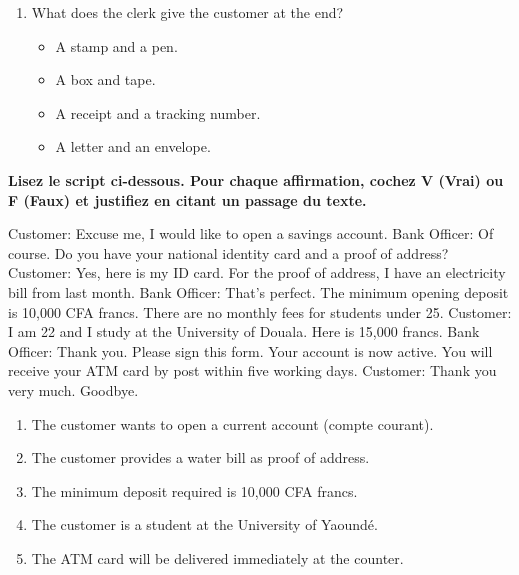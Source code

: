 \documentclass[11pt]{article}
\begin{document}
\begin{exercice}
\begin{enumerate}
\begin{itemize}
\end{itemize}
\item What does the clerk give the customer at the end? 
\begin{itemize}
\item[A.] A stamp and a pen. \item[B.] A box and tape. \item[C.] A receipt and a tracking number. \item[D.] A letter and an envelope.
\end{itemize}
\end{enumerate}
\end{exercice}

\begin{exercice}
\textbf{Lisez le script ci-dessous. Pour chaque affirmation, cochez V (Vrai) ou F (Faux) et justifiez en citant un passage du texte.}
\begin{textebox}
Customer: Excuse me, I would like to open a savings account.
Bank Officer: Of course. Do you have your national identity card and a proof of address?
Customer: Yes, here is my ID card. For the proof of address, I have an electricity bill from last month.
Bank Officer: That's perfect. The minimum opening deposit is 10,000 CFA francs. There are no monthly fees for students under 25.
Customer: I am 22 and I study at the University of Douala. Here is 15,000 francs.
Bank Officer: Thank you. Please sign this form. Your account is now active. You will receive your ATM card by post within five working days.
Customer: Thank you very much. Goodbye.
\end{textebox}
\begin{enumerate}
\item The customer wants to open a current account (compte courant).
\item The customer provides a water bill as proof of address.
\item The minimum deposit required is 10,000 CFA francs.
\item The customer is a student at the University of Yaoundé.
\item The ATM card will be delivered immediately at the counter.
\end{enumerate}
\end{exercice}
\end{document}
